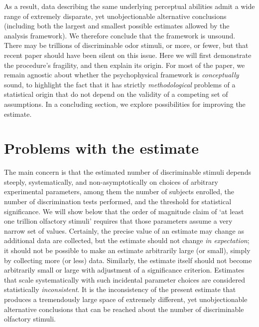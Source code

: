 \documentclass[letterpaper,twocolumn,10pt]{article}
\begin{document}
As a result, data describing the same underlying perceptual abilities admit a wide range of extremely disparate, 
yet unobjectionable alternative conclusions (including both the largest and smallest possible estimates allowed by the analysis framework). 
We therefore conclude that the framework is unsound. 
There may be trillions of discriminable odor stimuli, or more, or fewer, 
but that recent paper should have been silent on this issue.  
Here we will first demonstrate the procedure's fragility, and then explain its origin. 
For most of the paper, we remain agnostic about whether the psychophysical framework is \textit{conceptually} sound, 
to highlight the fact that it has strictly \textit{methodological} problems of a statistical origin that do not depend on the validity of a competing set of assumptions. %
In a concluding section, we explore possibilities for improving the estimate. 

\section{Problems with the estimate}
\label{sec:demonstration}

The main concern is that the estimated number of discriminable stimuli depends steeply, systematically, and non-asymptotically on choices of arbitrary experimental parameters, 
among them the number of subjects enrolled, the number of discrimination tests performed, and the threshold for statistical significance.  
We will show below that the order of magnitude claim of `at least one trillion olfactory stimuli' requires that those parameters assume a very narrow set of values. 
Certainly, the precise value of an estimate may change as additional data are collected, 
but the estimate should not change \textit{in expectation}; it should not be possible to make an estimate arbitrarily large (or small), 
simply by collecting more (or less) data. Similarly, the estimate itself should not become arbitrarily small or large with adjustment of a significance criterion. Estimates that scale systematically with such incidental parameter choices are considered statistically \textit{inconsistent}. It is the inconsistency of the present estimate that produces a tremendously large space of extremely different, yet unobjectionable alternative conclusions that can be reached about the number of discriminable olfactory stimuli. 
\end{document}
